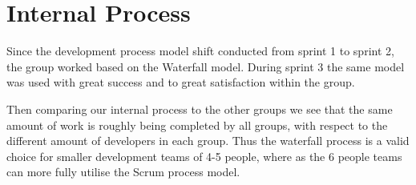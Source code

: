  \section{Internal Process}
Since the development process model shift conducted from sprint 1 to sprint 2, the group worked based on the Waterfall model. 
During sprint 3 the same model was used with great success and to great satisfaction within the group. 

Then comparing our internal process to the other groups we see that the same amount of work is roughly being completed by all groups, with respect to the different amount of developers in each group. 
Thus the waterfall process is a valid choice for smaller development teams of 4-5 people, where as the 6 people teams can more fully utilise the Scrum process model. 

